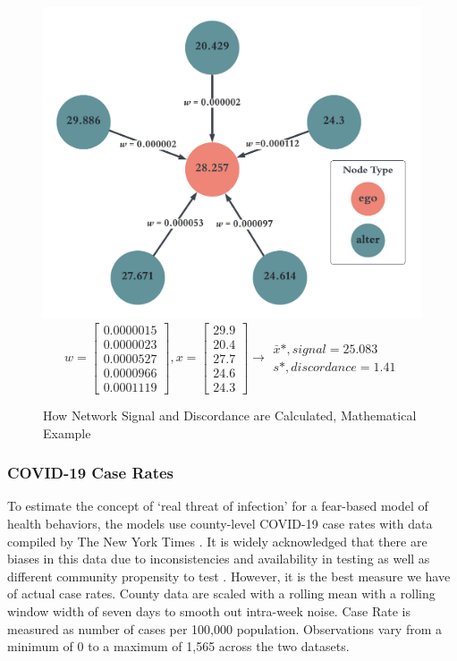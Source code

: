 \begin{figure}
\begin{center}\includegraphics[width=0.5\linewidth,]{figs/paper3/discordancenetwork-1.pdf} 
  \begin{equation}
    w = \begin{bmatrix}0.0000015\\0.0000023\\0.0000527\\0.0000966\\0.0001119\end{bmatrix},  
    x = \begin{bmatrix}29.9\\20.4\\27.7\\24.6\\24.3\end{bmatrix} \longrightarrow
    \begin{matrix} \bar{x}*, signal = 25.083\\ s*, discordance = 1.41 \end{matrix} 
  \end{equation}
  \caption{How Network Signal and Discordance are Calculated, Mathematical Example}
  \label{fig:discordancenetwork}
  \end{center}
\end{figure}

\hypertarget{COVID-19-case-rates}{%
\subsubsection{COVID-19 Case Rates}\label{COVID-19-case-rates}}

To estimate the concept of `real threat of infection' for a fear-based model of
health behaviors, the models use county-level COVID-19 case rates with data
compiled by The New York Times \citeyearpar{covid_data}. It is widely
acknowledged that there are biases in this data due to inconsistencies and
availability in testing as well as different community propensity to test
\citep{gu22, cdc20a}. However, it is the best measure we have of actual case
rates. County data are scaled with a rolling mean with a rolling window width of
seven days to smooth out intra-week noise. Case Rate is measured as number of
cases per 100,000 population. Observations vary from a minimum of 0 to a maximum
of 1,565 across the two datasets.


